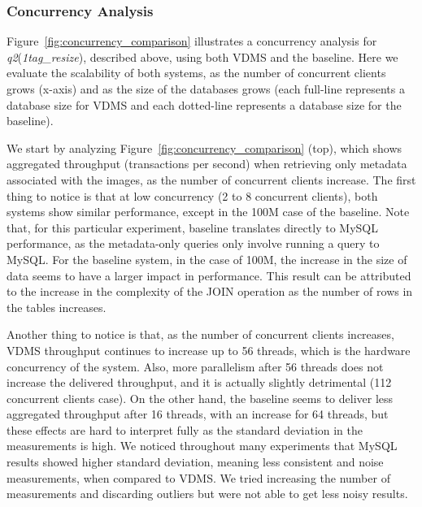 
\subsubsection{Concurrency Analysis} \label{concurrency analysis}

Figure~\ref{fig:concurrency_comparison} illustrates a concurrency analysis for
\textit{q2}(\textit{1tag\_resize}), described above,
using both VDMS and the baseline.
Here we evaluate the scalability of both systems, as the number of concurrent
clients grows (x-axis) and as the
size of the databases grows (each full-line represents a database size
for VDMS and each dotted-line represents a database size for the baseline).

We start by analyzing Figure~\ref{fig:concurrency_comparison} (top),
which shows aggregated throughput (transactions per second)
when retrieving only metadata associated with the images, as the number of
concurrent clients increase.
The first thing to notice is that at low concurrency (2 to 8 concurrent clients),
both systems show similar performance, except in the 100M case of the baseline.
Note that, for this particular experiment,
baseline translates directly to MySQL performance,
as the metadata-only queries only involve running a query to MySQL.
For the baseline system, in the case of 100M, the increase in the
size of data seems to have a larger impact in performance.
This result can be attributed to the increase in the complexity of the JOIN
operation as the number of rows in the tables increases.

Another thing to notice is that, as the number of concurrent clients increases,
VDMS throughput continues to increase up to 56 threads, which is
the hardware concurrency of the system.
Also, more parallelism after 56 threads does not increase the delivered throughput,
and it is actually slightly detrimental (112 concurrent clients case).
On the other hand, the baseline seems to deliver less aggregated
throughput after 16 threads, with an increase for 64 threads, but these effects
are hard to interpret fully as the standard deviation in the measurements is high.
We noticed throughout many experiments that MySQL results showed higher
standard deviation, meaning less consistent and noise measurements, when compared
to VDMS.
We tried increasing the number of measurements and discarding
outliers but were not able to get less noisy results.

